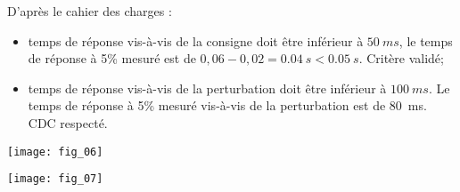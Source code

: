 
\ifprof
\begin{corrige}
D'après le cahier des charges :
\begin{itemize}
\item temps de réponse vis-à-vis de la consigne doit être inférieur à $\SI{50}{ms}$, le temps de réponse à 5\% mesuré est de $0,06-0,02 = \SI{0,04}{s} < \SI{0,05}{s}$. Critère validé;
\item temps de réponse vis-à-vis de la perturbation doit être inférieur à $\SI{100}{ms}$. Le temps de réponse à 5\% mesuré vis-à-vis de la perturbation est de \SI{80}{ms}. CDC respecté.
\end{itemize}
\end{corrige}
\else
\fi

\ifprof
\else
\begin{center}
\texttt{[image: fig\_06]}
\end{center}

\begin{center}
\texttt{[image: fig\_07]}
\end{center}
\fi


